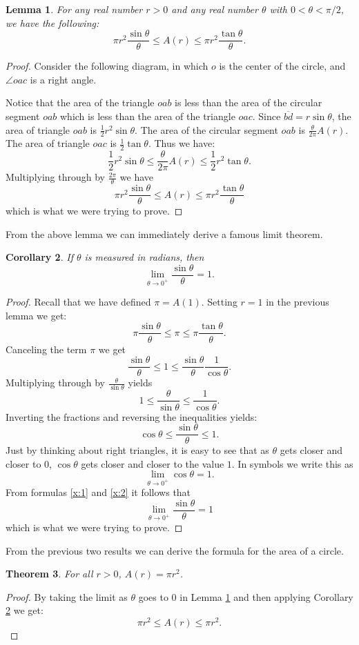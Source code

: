 \documentclass[twoside,twocolumn,12pt]{amsart}
\theoremstyle{plain}
\newtheorem{Theorem}{Theorem}
\newtheorem{Lemma}[Theorem]{Lemma}
\newtheorem{Corollary}[Theorem]{Corollary}
\theoremstyle{definition}
\begin{document}
\begin{Lemma}
\label{Lemma0}
For any real number $r>0$ and any real number $\theta$ with
$0<\theta<\pi/2$, we have the following:
$$\pi r^2 \frac{\sin\theta}{\theta}\leq A(r)\leq
\pi r^2 \frac{\tan\theta}{\theta}.$$
\end{Lemma}
\begin{proof}
Consider the  following diagram, in which $o$ is the center
of the circle, and $\angle oac$ is a right angle.

\mbox{}
Notice that the area of the triangle $oab$ is less than the area of
the circular segment $oab$ which is less than the area of the
triangle $oac$.
Since $\overline{bd}=r\sin\theta$,
the area of triangle $oab$ is $\frac{1}{2}r^2\sin\theta$.
The area of the circular
segment $oab$ is $\frac{\theta}{2\pi}A(r)$. The area of triangle $oac$ is
$\frac{1}{2}\tan\theta$.
Thus we have:
$$\frac{1}{2}r^2\sin\theta\leq\frac{\theta}{2\pi}A(r)\leq
\frac{1}{2}r^2\tan\theta.$$
Multiplying through by $\frac{2\pi}{\theta}$ we have
$$\pi r^2 \frac{\sin\theta}{\theta}\leq A(r)\leq
\pi r^2 \frac{\tan\theta}{\theta}$$
which is what we were trying to prove.
\end{proof}
%
From the above lemma we can immediately derive  a famous limit theorem.
%
\begin{Corollary}
\label{Cor1}
If $\theta$ is measured in radians, then
$$\lim_{\theta\to 0^{+}}\frac{\sin\theta}{\theta}=1.$$
\end{Corollary}
\begin{proof}
Recall that we have defined $\pi=A(1)$. Setting $r=1$ in the previous
lemma we get:
$$\pi \frac{\sin\theta}{\theta}\leq\pi\leq
\pi \frac{\tan\theta}{\theta}.$$
Canceling the term  $\pi$ we get
$$\frac{\sin\theta}{\theta}\leq 1 \leq
\frac{\sin\theta}{\theta}\frac{1}{\cos\theta}.$$
Multiplying through by $\frac{\theta}{\sin\theta}$ yields
$$1\leq\frac{\theta}{\sin\theta}\leq\frac{1}{\cos\theta}.$$
Inverting the fractions and reversing the inequalities yields:
\begin{equation}
\label{x:1}
\cos\theta\leq\frac{\sin\theta}{\theta}\leq 1.
\end{equation}
Just by thinking about right triangles, it is easy to see that
as $\theta$ gets closer and closer to 0, $\cos\theta$ gets closer and
closer to the value $1$. In symbols we write this as
\begin{equation}
\label{x:2}
\lim_{\theta\to 0^{+}}\cos\theta=1.
\end{equation}
From formulas \ref{x:1} and \ref{x:2} it follows that
$$\lim_{\theta\to 0^{+}}\frac{\sin\theta}{\theta}=1$$
which is what we were trying to prove.
\end{proof}
%
From the previous two results we can derive the formula for the area
of a circle.
%
\begin{Theorem}
\label{AreaTheorem}
For all $r>0$, $A(r)=\pi r^2$.
\end{Theorem}
\begin{proof}
By taking the limit as $\theta$ goes to 0 in Lemma \ref{Lemma0} and
then applying Corollary \ref{Cor1} we get:
$$\pi r^2\leq A(r) \leq \pi r^2.$$
\end{proof}
\end{document}
